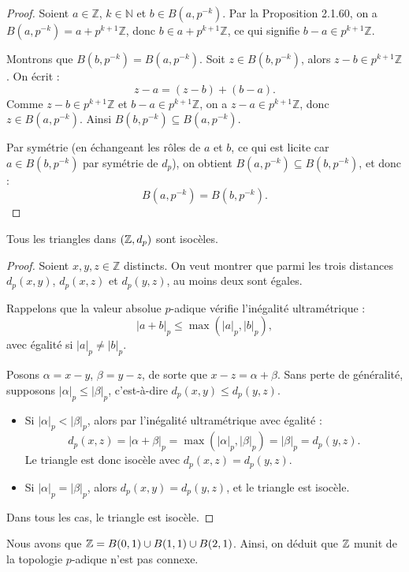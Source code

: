 \begin{proof}
Soient $a \in \mathbb{Z}$, $k \in \mathbb{N}$ et $b \in B(a, p^{-k})$. Par la Proposition 2.1.60, on a $B(a, p^{-k}) = a + p^{k+1}\mathbb{Z}$, donc $b \in a + p^{k+1}\mathbb{Z}$, ce qui signifie $b - a \in p^{k+1}\mathbb{Z}$.

Montrons que $B(b, p^{-k}) = B(a, p^{-k})$. Soit $z \in B(b, p^{-k})$, alors $z - b \in p^{k+1}\mathbb{Z}$. On écrit :
$$z - a = (z - b) + (b - a).$$
Comme $z - b \in p^{k+1}\mathbb{Z}$ et $b - a \in p^{k+1}\mathbb{Z}$, on a $z - a \in p^{k+1}\mathbb{Z}$, donc $z \in B(a, p^{-k})$. Ainsi $B(b, p^{-k}) \subseteq B(a, p^{-k})$.

Par symétrie (en échangeant les rôles de $a$ et $b$, ce qui est licite car $a \in B(b, p^{-k})$ par symétrie de $d_p$), on obtient $B(a, p^{-k}) \subseteq B(b, p^{-k})$, et donc :
$$B(a, p^{-k}) = B(b, p^{-k}). $$
\end{proof}

\begin{proposition}
    Tous les triangles dans $(\mathbb{Z}, d_p)$ sont isocèles.
\end{proposition}


\begin{proof}
Soient $x, y, z \in \mathbb{Z}$ distincts. On veut montrer que parmi les trois distances $d_p(x,y)$, $d_p(x,z)$ et $d_p(y,z)$, au moins deux sont égales.

Rappelons que la valeur absolue $p$-adique vérifie l'inégalité ultramétrique :
$$|a + b|_p \leq \max(|a|_p, |b|_p),$$
avec égalité si $|a|_p \neq |b|_p$.

Posons $\alpha = x - y$, $\beta = y - z$, de sorte que $x - z = \alpha + \beta$. Sans perte de généralité, supposons $|{\alpha}|_p \leq |\beta|_p$, c'est-à-dire $d_p(x,y) \leq d_p(y,z)$.

\begin{itemize}
    \item Si $|\alpha|_p < |\beta|_p$, alors par l'inégalité ultramétrique avec égalité :
    $$d_p(x, z) = |\alpha + \beta|_p = \max(|\alpha|_p, |\beta|_p) = |\beta|_p = d_p(y, z).$$
    Le triangle est donc isocèle avec $d_p(x,z) = d_p(y,z)$.
    \item Si $|\alpha|_p = |\beta|_p$, alors $d_p(x,y) = d_p(y,z)$, et le triangle est isocèle.
\end{itemize}
Dans tous les cas, le triangle est isocèle. 
\end{proof}

\begin{remarque}
    Nous avons que $\mathbb{Z}= B(0,1)\cup B(1,1) \cup B(2,1)$. Ainsi, on déduit que $\mathbb{Z}$ munit de la topologie $p$-adique n'est pas connexe.
\end{remarque}



